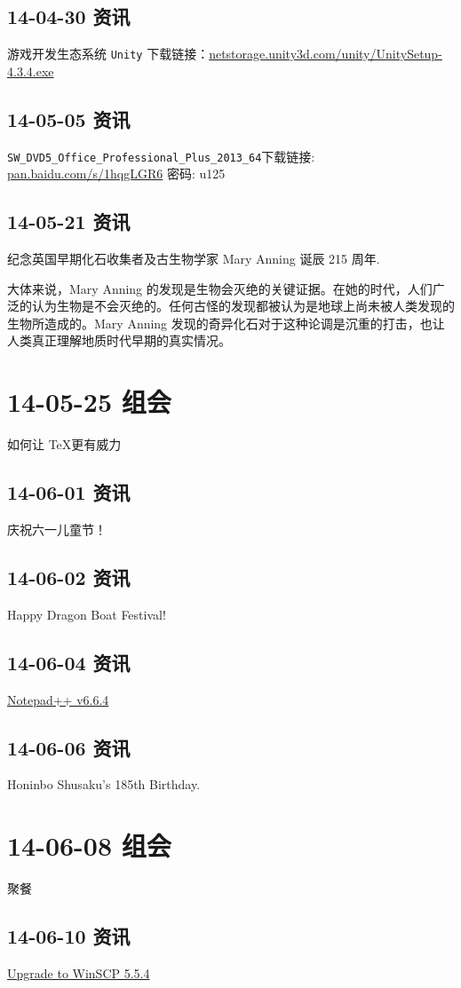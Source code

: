 \documentclass[]{report}
\begin{document}
	\subsection{14-04-30 资讯}
		游戏开发生态系统 \verb|Unity| 下载链接：\href{http://netstorage.unity3d.com/unity/UnitySetup-4.3.4.exe}{netstorage.unity3d.com/unity/UnitySetup-4.3.4.exe}
	\subsection{14-05-05 资讯}
		\verb|SW_DVD5_Office_Professional_Plus_2013_64|下载链接: \href{http://pan.baidu.com/s/1hqgLGR6}{pan.baidu.com/s/1hqgLGR6} 密码: u125
	\subsection{14-05-21 资讯}
		纪念英国早期化石收集者及古生物学家 Mary Anning 诞辰 215 周年.
		
		大体来说，Mary Anning 的发现是生物会灭绝的关键证据。在她的时代，人们广泛的认为生物是不会灭绝的。任何古怪的发现都被认为是地球上尚未被人类发现的生物所造成的。Mary Anning 发现的奇异化石对于这种论调是沉重的打击，也让人类真正理解地质时代早期的真实情况。
\section{14-05-25 组会}
	如何让 \TeX 更有威力
	\subsection{14-06-01 资讯}
		庆祝六一儿童节！
	\subsection{14-06-02 资讯}
		Happy Dragon Boat Festival!
	\subsection{14-06-04 资讯}
		\href{http://notepad-plus-plus.org/zh/download/v6.6.4.html}{Notepad++ v6.6.4}
	\subsection{14-06-06 资讯}
		Honinbo Shusaku's 185th Birthday.
\section{14-06-08 组会}
	聚餐~
	\subsection{14-06-10 资讯}
		\href{http://cdn.winscp.net/files/winscp554setup.exe}{Upgrade to WinSCP 5.5.4}
\end{document}

